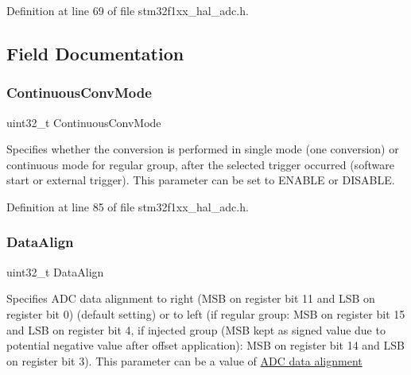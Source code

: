 Definition at line 69 of file stm32f1xx\+\_\+hal\+\_\+adc.\+h.



\subsection{Field Documentation}
\mbox{\label{struct_a_d_c___init_type_def_a768ec42e36553ad0acb7ad029462a59d}} 
\subsubsection{\texorpdfstring{Continuous\+Conv\+Mode}{ContinuousConvMode}}
{\footnotesize\ttfamily uint32\+\_\+t Continuous\+Conv\+Mode}

Specifies whether the conversion is performed in single mode (one conversion) or continuous mode for regular group, after the selected trigger occurred (software start or external trigger). This parameter can be set to E\+N\+A\+B\+LE or D\+I\+S\+A\+B\+LE. 

Definition at line 85 of file stm32f1xx\+\_\+hal\+\_\+adc.\+h.

\mbox{\label{struct_a_d_c___init_type_def_afe646b2571044212378bf5f722544359}} 
\subsubsection{\texorpdfstring{Data\+Align}{DataAlign}}
{\footnotesize\ttfamily uint32\+\_\+t Data\+Align}

Specifies A\+DC data alignment to right (M\+SB on register bit 11 and L\+SB on register bit 0) (default setting) or to left (if regular group\+: M\+SB on register bit 15 and L\+SB on register bit 4, if injected group (M\+SB kept as signed value due to potential negative value after offset application)\+: M\+SB on register bit 14 and L\+SB on register bit 3). This parameter can be a value of \hyperlink{group___a_d_c___data__align}{A\+DC data alignment} 

